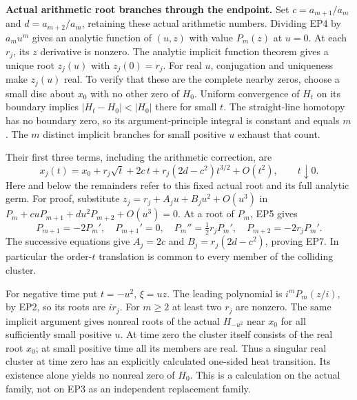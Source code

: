 \documentclass[11pt,a4paper]{article}
\theoremstyle{definition}\newtheorem{definition}[theorem]{Definition}
\begin{document}
\EP\textbf{Actual arithmetic root branches through the endpoint.}
Set $c=a_{m+1}/a_m$ and $d=a_{m+2}/a_m$, retaining these actual
arithmetic numbers. Dividing EP4 by $a_mu^m$ gives an analytic
function of $(u,z)$ with value $P_m(z)$ at $u=0$.
At each $r_j$, its $z$ derivative is nonzero. The analytic implicit
function theorem gives a unique root $z_j(u)$ with $z_j(0)=r_j$.
For real $u$, conjugation and uniqueness make $z_j(u)$ real.
To verify that these are the complete nearby zeros, choose a small
disc about $x_0$ with no other zero of $H_0$. Uniform convergence of
$H_t$ on its boundary implies
$|H_t-H_0|<|H_0|$ there for small $t$. The straight-line homotopy
has no boundary zero, so its argument-principle integral is
constant and equals $m$. The $m$ distinct implicit branches for
small positive $u$ exhaust that count.

Their first three terms, including the arithmetic correction, are
\[
 x_j(t)=x_0+r_j\sqrt t+2c\,t
              +r_j(2d-c^2)t^{3/2}+O(t^2),\qquad t\downarrow0.
 \tag{EP7}\label{ep:roots}
\]
Here and below the remainders refer to this fixed actual root and
its full analytic germ. For proof, substitute
$z_j=r_j+A_ju+B_ju^2+O(u^3)$ in
$P_m+cuP_{m+1}+du^2P_{m+2}+O(u^3)=0$.
At a root of $P_m$, EP5 gives
\[
 P_{m+1}=-2P_m',\quad P_{m+1}'=0,\quad
 P_m''=\tfrac12r_jP_m',\quad P_{m+2}=-2r_jP_m'.
\]
The successive equations give $A_j=2c$ and
$B_j=r_j(2d-c^2)$, proving EP7. In particular the order-$t$
translation is common to every member of the colliding cluster.

For negative time put $t=-u^2$, $\xi=uz$. The leading polynomial
is $i^mP_m(z/i)$, by EP2, so its roots are $ir_j$.
For $m\ge2$ at least two $r_j$ are nonzero. The same implicit
argument gives nonreal roots of the actual $H_{-u^2}$ near $x_0$
for all sufficiently small positive $u$.
At time zero the cluster itself consists of the real root $x_0$;
at small positive time all its members are real. Thus a singular
real cluster at time zero has an explicitly calculated one-sided
heat transition. Its existence alone yields no nonreal zero of
$H_0$. This is a calculation on the actual family, not on EP3 as
an independent replacement family.
\end{document}
